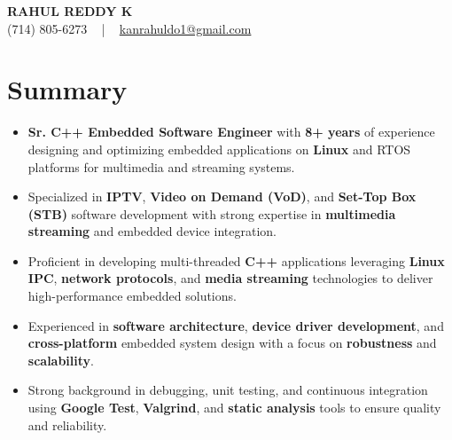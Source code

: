 \documentclass[letterpaper,11pt]{article}
\newcommand{\resumeItem}[1]{
  \item\footnotesize{
    {#1 \vspace{-2pt}}
  }
}
\newcommand{\resumeItemListStart}{\begin{itemize}[leftmargin=*]}
\newcommand{\resumeItemListEnd}{\end{itemize}\vspace{-5pt}}
\begin{document}
\begin{center}
    {\fontsize{14pt}{12pt}\selectfont \textbf{\MakeUppercase{Rahul Reddy K}}}\\ \vspace{2pt}
    \fontsize{10pt}{12pt}\selectfont (714) 805-6273 ~ | ~ \href{mailto:kanrahuldo1@gmail.com}{kanrahuldo1@gmail.com}~
    \vspace{-8pt}
\end{center}

\section{Summary}
\fontsize{9pt}{10pt}\selectfont
\resumeItemListStart
    \resumeItem{\textbf{Sr. C++ Embedded Software Engineer} with \textbf{8+ years} of experience designing and optimizing embedded applications on \textbf{Linux} and RTOS platforms for multimedia and streaming systems.} \vspace{-3pt}
    \resumeItem{Specialized in \textbf{IPTV}, \textbf{Video on Demand (VoD)}, and \textbf{Set-Top Box (STB)} software development with strong expertise in \textbf{multimedia streaming} and embedded device integration.} \vspace{-3pt}
    \resumeItem{Proficient in developing multi-threaded \textbf{C++} applications leveraging \textbf{Linux IPC}, \textbf{network protocols}, and \textbf{media streaming} technologies to deliver high-performance embedded solutions.} \vspace{-3pt}
    \resumeItem{Experienced in \textbf{software architecture}, \textbf{device driver development}, and \textbf{cross-platform} embedded system design with a focus on \textbf{robustness} and \textbf{scalability}.} \vspace{-3pt}
    \resumeItem{Strong background in debugging, unit testing, and continuous integration using \textbf{Google Test}, \textbf{Valgrind}, and \textbf{static analysis} tools to ensure quality and reliability.}
\resumeItemListEnd
\vspace{-6pt}
\end{document}
